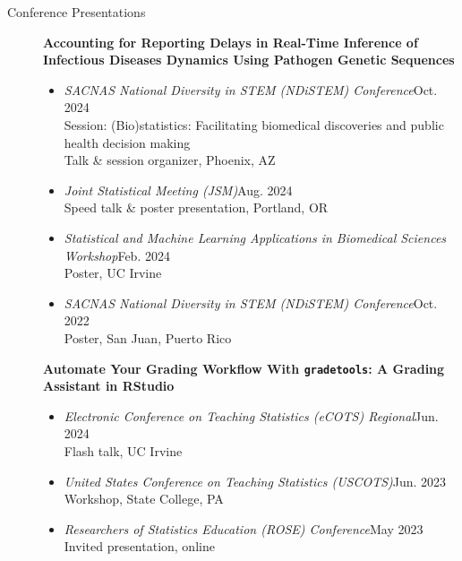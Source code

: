 \documentclass{article}
\begin{document}
	\begin{description}
		\vspace{-2mm}
		\item[Conference Presentations]\hspace*{.1in}
		
		\textbf{Accounting for Reporting Delays in Real-Time Inference of Infectious Diseases Dynamics Using Pathogen Genetic Sequences}
		\begin{itemize}
			\item \textit{SACNAS National Diversity in STEM (NDiSTEM) Conference}\hfill{Oct. 2024}\\
			Session: (Bio)statistics: Facilitating biomedical discoveries and public health decision making\\
			Talk \& session organizer, Phoenix, AZ
			
			\item \textit{Joint Statistical Meeting (JSM)}\hfill{Aug. 2024}\\
			Speed talk \& poster presentation, Portland, OR
			
			\item \textit{Statistical and Machine Learning Applications in Biomedical Sciences Workshop}\hfill{Feb. 2024}\\
			Poster, UC Irvine
			
			\item \textit{SACNAS National Diversity in STEM (NDiSTEM) Conference}\hfill{Oct. 2022}\\ 
			Poster, San Juan, Puerto Rico 
		\end{itemize}
		
		\textbf{Automate Your Grading Workflow With \texttt{gradetools}: A Grading Assistant in RStudio}
		\begin{itemize}
			\item \textit{Electronic Conference on Teaching Statistics (eCOTS) Regional}\hfill{Jun. 2024}\\
			Flash talk, UC Irvine
			
			\item \textit{United States Conference on Teaching Statistics (USCOTS)}\hfill{Jun. 2023}\\
			Workshop, State College, PA
			
			\item \textit{Researchers of Statistics Education (ROSE) Conference}\hfill{May 2023}\\
			Invited presentation, online
		\end{itemize}
		

\end{description}
\end{document}
